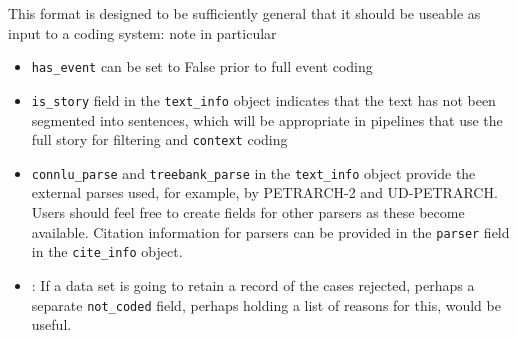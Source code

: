 \documentclass[11pt]{report}
\begin{document}
This format is designed to be sufficiently general that it should be useable as input to a coding system: note in particular
\begin{itemize}
\item \texttt{has\_event} can be set to False prior to full event coding 
\item \texttt{is\_story} field in the \texttt{text\_info} object indicates that the text has not been segmented into sentences, which will be appropriate in pipelines that use the full story for filtering and \texttt{context} coding
\item \texttt{connlu\_parse} and \texttt{treebank\_parse} in the \texttt{text\_info} object provide the external parses used, for example, by PETRARCH-2 and UD-PETRARCH. Users should feel free to create fields for other parsers as these become available. Citation information for parsers can be provided in the \texttt{parser} field in the \texttt{cite\_info} object.
\item \color{red}{Open issue 20.02.29 PAS}: \color{black}If a data set is going to retain a record of the cases rejected, perhaps a separate \texttt{not\_coded} field, perhaps holding a list of reasons for this, would be useful.
\end{itemize}

\newpage 
\end{document}
